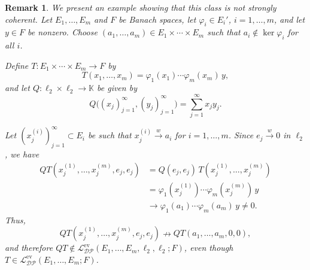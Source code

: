 \documentclass[12 pt]{article}%
\newtheorem{remark}[theorem]{Remark}
\newtheorem{final remark}[theorem]{Final Remark}
\begin{document}
\begin{remark}
	We present an example showing that this class is not strongly coherent. Let $E_1,\dots,E_m$ and $F$ be Banach spaces, let $\varphi_i \in E_i'$, $i=1,\dots,m$, and let $y \in F$ be nonzero. Choose $(a_1,\dots,a_m) \in E_1 \times \cdots \times E_m$ such that $a_i \notin \ker \varphi_i$ for all $i$.
	
	Define $T \colon E_1 \times \cdots \times E_m \to F$ by
	\begin{equation*}
		T(x_1,\dots,x_m) = \varphi_1(x_1)\cdots \varphi_m(x_m)\, y,
	\end{equation*}
	and let $Q \colon \ell_2 \times \ell_2 \to \mathbb{K}$ be given by
	\begin{equation*}
		Q\big((x_j)_{j=1}^{\infty}, (y_j)_{j=1}^{\infty}\big) = \sum_{j=1}^{\infty} x_j y_j.
	\end{equation*}
	
	Let $(x_j^{(i)})_{j=1}^{\infty} \subset E_i$ be such that $x_j^{(i)} \overset{w}{\to} a_i$ for $i=1,\dots,m$. Since $e_j \overset{w}{\to} 0$ in $\ell_2$, we have
	\begin{align*}
		QT(x_j^{(1)},\dots,x_j^{(m)},e_j,e_j)
		&= Q(e_j,e_j)\, T(x_j^{(1)},\dots,x_j^{(m)}) \\
		&= \varphi_1(x_j^{(1)})\cdots \varphi_m(x_j^{(m)})\, y \\
		&\longrightarrow \varphi_1(a_1)\cdots \varphi_m(a_m)\, y \neq 0.
	\end{align*}
	Thus,
	\begin{equation*}
		QT(x_j^{(1)},\dots,x_j^{(m)},e_j,e_j) \nrightarrow QT(a_1,\dots,a_m,0,0),
	\end{equation*}
	and therefore $QT \notin \mathcal{L_{DP}^{\mathrm{ev}}}(E_1,\dots,E_m,\ell_2,\ell_2;F)$, even though $T \in \mathcal{L_{DP}^{\mathrm{ev}}}(E_1,\dots,E_m;F)$.
\end{remark}

\end{document}
